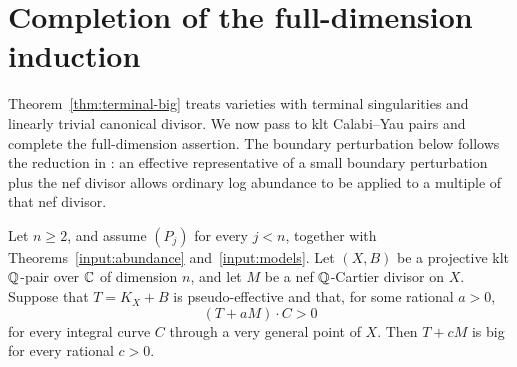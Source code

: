 \section{Completion of the full-dimension induction}
\label{sec:completion}

Theorem~\ref{thm:terminal-big} treats varieties with terminal
singularities and linearly trivial canonical divisor.  We now pass to
klt Calabi--Yau pairs and complete the full-dimension assertion.  The
boundary perturbation below follows the reduction in
\cite[Section~7]{LP}: an effective representative of a small boundary
perturbation plus the nef divisor allows ordinary log abundance to be
applied to a multiple of that nef divisor.

\begin{proposition}\label{prop:full-all}
Let $n\geq 2$, and assume $(P_j)$ for every $j<n$, together with
Theorems~\ref{input:abundance}
and~\ref{input:models}.  Let $(X,B)$ be a projective klt $\mathbb Q$-pair over
$\mathbb C$ of dimension $n$, and let $M$ be a nef $\mathbb Q$-Cartier divisor on $X$.
Suppose that $T=K_X+B$ is pseudo-effective and that, for some rational
$a>0$,
\[
  (T+aM)\cdot C>0
\]
for every integral curve $C$ through a very general point of $X$.
Then $T+cM$ is big for every rational $c>0$.
\end{proposition}

